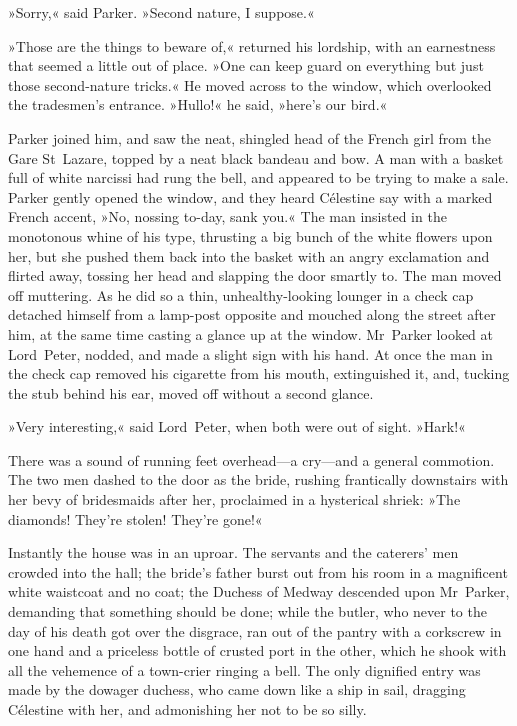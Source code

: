 »Sorry,« said Parker. »Second nature, I suppose.«

»Those are the things to beware of,« returned his lordship, with an earnestness that seemed a little out of place. »One can keep guard on everything but just those second-nature tricks.« He moved across to the window, which overlooked the tradesmen's entrance. »Hullo!« he said, »here's our bird.«

Parker joined him, and saw the neat, shingled head of the French girl from the Gare St~Lazare, topped by a neat black bandeau and bow. A man with a basket full of white narcissi had rung the bell, and appeared to be trying to make a sale. Parker gently opened the window, and they heard Célestine say with a marked French accent, »No, nossing to-day, sank you.« The man insisted in the monotonous whine of his type, thrusting a big bunch of the white flowers upon her, but she pushed them back into the basket with an angry exclamation and flirted away, tossing her head and slapping the door smartly to. The man moved off muttering. As he did so a thin, unhealthy-looking lounger in a check cap detached himself from a lamp-post opposite and mouched along the street after him, at the same time casting a glance up at the window. Mr~Parker looked at Lord~Peter, nodded, and made a slight sign with his hand. At once the man in the check cap removed his cigarette from his mouth, extinguished it, and, tucking the stub behind his ear, moved off without a second glance.

»Very interesting,« said Lord~Peter, when both were out of sight. »Hark!«

There was a sound of running feet overhead—a cry—and a general commotion. The two men dashed to the door as the bride, rushing frantically downstairs with her bevy of bridesmaids after her, proclaimed in a hysterical shriek: »The diamonds! They're stolen! They're gone!«

Instantly the house was in an uproar. The servants and the caterers' men crowded into the hall; the bride's father burst out from his room in a magnificent white waistcoat and no coat; the Duchess of Medway descended upon Mr~Parker, demanding that something should be done; while the butler, who never to the day of his death got over the disgrace, ran out of the pantry with a corkscrew in one hand and a priceless bottle of crusted port in the other, which he shook with all the vehemence of a town-crier ringing a bell. The only dignified entry was made by the dowager duchess, who came down like a ship in sail, dragging Célestine with her, and admonishing her not to be so silly.

